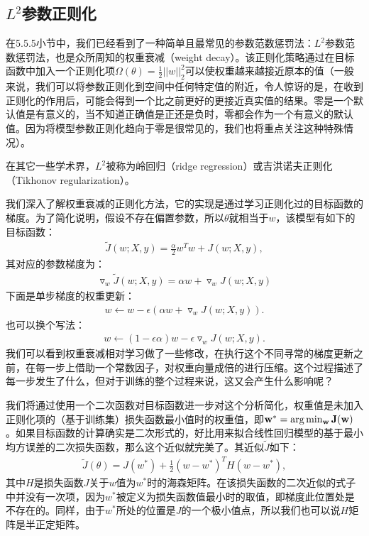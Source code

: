 \subsection{$L^2$参数正则化}

在5.5.5小节中，我们已经看到了一种简单且最常见的参数范数惩罚法：$L^2$参数范数惩罚法，也是众所周知的权重衰减（weight decay）。该正则化策略通过在目标函数中加入一个正则化项$\Omega(\theta) = \frac{1}{2} ||w||_2^2$可以使权重越来越接近原本的值（一般来说，我们可以将参数正则化到空间中任何特定值的附近，令人惊讶的是，在收到正则化的作用后，可能会得到一个比之前更好的更接近真实值的结果。零是一个默认值是有意义的，当不知道正确值是正还是负时，零都会作为一个有意义的默认值。因为将模型参数正则化趋向于零是很常见的，我们也将重点关注这种特殊情况）。

在其它一些学术界，$L^2$被称为岭回归（ridge regression）或吉洪诺夫正则化（Tikhonov regularization）。

我们深入了解权重衰减的正则化方法，它的实现是通过学习正则化过的目标函数的梯度。为了简化说明，假设不存在偏置参数，所以$\theta$就相当于$w$，该模型有如下的目标函数：
$$
\begin{aligned}
	\widetilde{J} (w; X, y) = \frac{\alpha}{2} w^T w + J(w; X, y),
\end{aligned}
$$
其对应的参数梯度为：
$$
\begin{aligned}
	\triangledown_w \widetilde{J}(w;X,y) = \alpha w + \triangledown_w J(w;X,y)
\end{aligned}
$$
下面是单步梯度的权重更新：
$$
\begin{aligned}
	w \leftarrow w - \epsilon (\alpha w + \triangledown_w J(w; X, y)).
\end{aligned}
$$
也可以换个写法：
$$
\begin{aligned}
	w \leftarrow (1 - \epsilon \alpha)w - \epsilon \triangledown_w J(w; X, y).
\end{aligned}
$$
我们可以看到权重衰减相对学习做了一些修改，在执行这个不同寻常的梯度更新之前，在每一步上借助一个常数因子，对权重向量成倍的进行压缩。这个过程描述了每一步发生了什么，但对于训练的整个过程来说，这又会产生什么影响呢？

我们将通过使用一个二次函数对目标函数进一步对这个分析简化，权重值是未加入正则化项的（基于训练集）损失函数最小值时的权重值，即$\bf{w}^* = \arg \min_w J(w)$。如果目标函数的计算确实是二次形式的，好比用来拟合线性回归模型的基于最小均方误差的二次损失函数，那么这个近似就完美了。其近似$\widetilde{J}$如下：
$$
\begin{aligned}
	\widetilde{J}(\theta) = J(w^*) + \frac{1}{2} (w - w^*)^T H (w - w^*),
\end{aligned}
$$
其中$H$是损失函数$J$关于$w$值为$w^*$时的海森矩阵。在该损失函数的二次近似的式子中并没有一次项，因为$w^*$被定义为损失函数值最小时的取值，即梯度此位置处是不存在的。同样，由于$w^*$所处的位置是$J$的一个极小值点，所以我们也可以说$H$矩阵是半正定矩阵。

